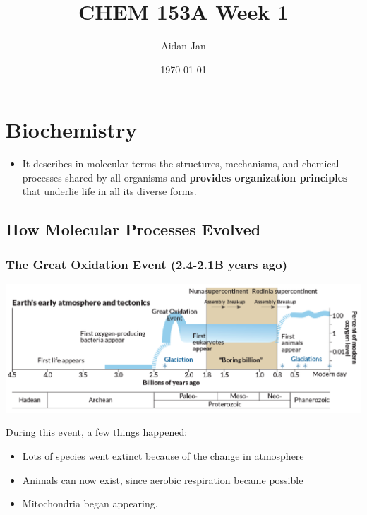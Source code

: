 \documentclass[10pt]{article}
\title{CHEM 153A Week 1}
\author{Aidan Jan}
\date{\today}
\begin{document}
\maketitle
\section*{Biochemistry}
\begin{itemize}
    \item It describes in molecular terms the structures, mechanisms, and chemical processes shared by all organisms and \textbf{provides organization principles} that underlie life in all its diverse forms.
\end{itemize}

\subsection*{How Molecular Processes Evolved}
\subsubsection*{The Great Oxidation Event (2.4-2.1B years ago)}
\begin{center}
\includegraphics*[width=\textwidth]{L1_1.png}
\end{center}
During this event, a few things happened:
\begin{itemize}
    \item Lots of species went extinct because of the change in atmosphere
    \item Animals can now exist, since aerobic respiration became possible
    \item Mitochondria began appearing.
\end{itemize}
\end{document}
